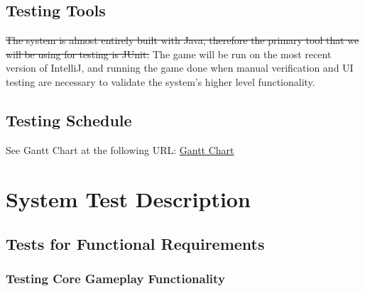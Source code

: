 \documentclass[12pt, titlepage]{article}
\begin{document}
\subsection{Testing Tools}

\st{The system is almost entirely built with Java, therefore the primary tool that we will be using for testing is JUnit. }The game will be run on the most recent version of IntelliJ, and running the game done when manual verification and UI testing are necessary to validate the system's higher level functionality.

\subsection{Testing Schedule}

See Gantt Chart at the following URL:
\href{run:././ProjectSchedule/sketchysupermariobros.gan}{Gantt Chart}

\section{System Test Description}

\subsection{Tests for Functional Requirements}

\subsubsection{Testing Core Gameplay Functionality}

\end{document}
